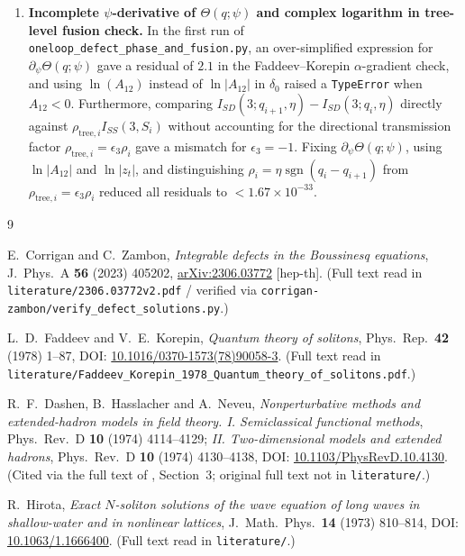 \documentclass[11pt,a4paper]{article}
\newcommand{\ii}{\mathrm{i}}
\newcommand{\sgn}{\operatorname{sgn}}
\begin{document}
\begin{enumerate}
$s \in \mathbb{R}$. Similarly, writing $\ln|\tan(\psi_{s'}/2)|$ instead of the
analytic function $\frac{1}{2}\ln\frac{1-\cos\psi_{s'}}{1+\cos\psi_{s'}}$ in
$\Delta P_D$ and $\Delta E_D^{\mathrm{ren}}$ introduced a $0.2073$ branch-cut
error for $|s|>2$ ($\gamma = \pi+\ii\beta$); using $\frac{1}{2}\ln\frac{1-\cos\psi_{s'}}{1+\cos\psi_{s'}}$
gave agreement to $7.52\times 10^{-37}$.
\item \textbf{Incomplete $\psi$-derivative of $\Theta(q;\psi)$ and complex logarithm in tree-level fusion check.}
In the first run of \texttt{oneloop\_defect\_phase\_and\_fusion.py}, an
over-simplified expression for $\partial_\psi\Theta(q;\psi)$ gave a residual of
$2.1$ in the Faddeev--Korepin $\alpha$-gradient check, and using $\ln(A_{12})$
instead of $\ln|A_{12}|$ in $\delta_0$ raised a \texttt{TypeError} when $A_{12}<0$.
Furthermore, comparing $I_{SD}(3;q_{i+1},\eta)-I_{SD}(3;q_i,\eta)$ directly
against $\rho_{\mathrm{tree},i} I_{SS}(3,S_i)$ without accounting for the
directional transmission factor $\rho_{\mathrm{tree},i} = \epsilon_3\rho_i$ gave
a mismatch for $\epsilon_3=-1$. Fixing $\partial_\psi\Theta(q;\psi)$, using
$\ln|A_{12}|$ and $\ln|z_t|$, and distinguishing $\rho_i = \eta\sgn(q_i-q_{i+1})$
from $\rho_{\mathrm{tree},i} = \epsilon_3\rho_i$ reduced all residuals to
$< 1.67\times 10^{-33}$.
\end{enumerate}

\begin{thebibliography}{9}

E.~Corrigan and C.~Zambon,
\emph{Integrable defects in the Boussinesq equations},
J.~Phys.~A \textbf{56} (2023) 405202,
\href{https://arxiv.org/abs/2306.03772}{arXiv:2306.03772} [hep-th].
(Full text read in \texttt{literature/2306.03772v2.pdf} / verified via
\texttt{corrigan-zambon/verify\_defect\_solutions.py}.)

L.~D.~Faddeev and V.~E.~Korepin,
\emph{Quantum theory of solitons},
Phys.~Rep.\ \textbf{42} (1978) 1--87,
DOI: \href{https://doi.org/10.1016/0370-1573(78)90058-3}{10.1016/0370-1573(78)90058-3}.
(Full text read in \texttt{literature/Faddeev\_Korepin\_1978\_Quantum\_theory\_of\_solitons.pdf}.)

R.~F.~Dashen, B.~Hasslacher and A.~Neveu,
\emph{Nonperturbative methods and extended-hadron models in field theory. I. Semiclassical functional methods},
Phys.~Rev.~D \textbf{10} (1974) 4114--4129;
\emph{II. Two-dimensional models and extended hadrons},
Phys.~Rev.~D \textbf{10} (1974) 4130--4138,
DOI: \href{https://doi.org/10.1103/PhysRevD.10.4130}{10.1103/PhysRevD.10.4130}.
(Cited via the full text of \cite{FK1978}, Section~3; original full text not in \texttt{literature/}.)

R.~Hirota,
\emph{Exact $N$-soliton solutions of the wave equation of long waves in shallow-water and in nonlinear lattices},
J.~Math.~Phys.\ \textbf{14} (1973) 810--814,
DOI: \href{https://doi.org/10.1063/1.1666400}{10.1063/1.1666400}.
(Full text read in \texttt{literature/}.)

\end{thebibliography}
\end{document}
